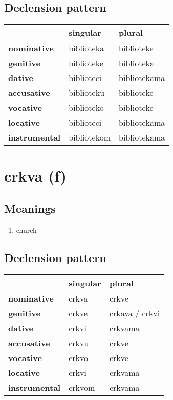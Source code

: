 \subsection*{Declension pattern}
\begin{tabularx}{\linewidth}{Xll}
\toprule
{} &     singular &        plural \\
\midrule
\textbf{nominative  } &   biblioteka &    biblioteke \\
\textbf{genitive    } &   biblioteke &    biblioteka \\
\textbf{dative      } &   biblioteci &  bibliotekama \\
\textbf{accusative  } &   biblioteku &    biblioteke \\
\textbf{vocative    } &   biblioteko &    biblioteke \\
\textbf{locative    } &   biblioteci &  bibliotekama \\
\textbf{instrumental} &  bibliotekom &  bibliotekama \\
\bottomrule
\end{tabularx}

\filbreak
\section{crkva (f)}
\subsection*{Meanings}
\begin{enumerate}
\item church
\end{enumerate}
\subsection*{Declension pattern}
\begin{tabularx}{\linewidth}{Xll}
\toprule
{} & singular &          plural \\
\midrule
\textbf{nominative  } &    crkva &           crkve \\
\textbf{genitive    } &    crkve &  crkava / crkvi \\
\textbf{dative      } &    crkvi &         crkvama \\
\textbf{accusative  } &    crkvu &           crkve \\
\textbf{vocative    } &    crkvo &           crkve \\
\textbf{locative    } &    crkvi &         crkvama \\
\textbf{instrumental} &   crkvom &         crkvama \\
\bottomrule
\end{tabularx}


